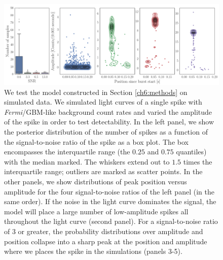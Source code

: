 \documentclass[12pt]{emulateapj}
\newcommand{\project}[1]{\textsl{#1}}
\newcommand{\fermi}{\project{Fermi}}
\begin{document}
\begin{figure}[htbp]
\includegraphics[width=\textwidth]{f3.pdf}%
\caption{We test the model constructed in Section \ref{ch6:methods} on simulated data. We simulated light curves of a single spike with \fermi/GBM-like background count rates and
varied the amplitude of the spike in order to test detectability. In the left panel, we show the posterior distribution of the number of spikes as a function of the signal-to-noise ratio of the spike
 as a box plot. The box encompasses the interquartile range (the $0.25$ and $0.75$ quantiles) with the median marked. The whiskers extend out to $1.5$ times the interquartile range; 
 outliers are marked as scatter points. In the other panels, we show distributions of peak position versus amplitude for the four signal-to-noise ratios of the left panel (in the same order). If the noise 
 in the light curve dominates the signal, the model will place a large number of low-amplitude spikes all throughout the light curve (second panel). For a signal-to-noise ratio of 3 or greater, the 
 probability distributions over amplitude and position collapse into a sharp peak at the position and amplitude where we places the spike in the simulations (panels 3-5).}
\label{fig:onespike}
\end{figure}
\end{document}
